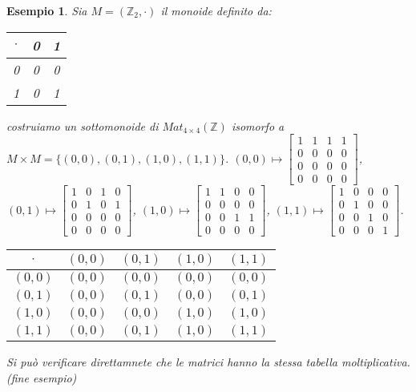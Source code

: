 \documentclass[a4paper,12pt]{article}
\theoremstyle{def}
\theoremstyle{prop}
\theoremstyle{esempio}
\newtheorem*{example}{Esempio}
\theoremstyle{dimostrazione}
\theoremstyle{teo}
\theoremstyle{osservazione}
\begin{document}
\newpage
\begin{example}
	Sia \(M = (\mathbb{Z}_2, \cdot)\) il monoide definito da:
	\begin{table}[htbp]
		\centering
		\begin{tabular}{|c|c|c|}
			\hline
			\(\cdot\) & 0 & 1 \\ \hline
			0         & 0 & 0 \\ \hline
			1         & 0 & 1 \\ \hline
		\end{tabular}
	\end{table}
	\newline costruiamo un sottomonoide di \(Mat_{4 \times 4}(\mathbb{Z})\) isomorfo a \(M \times M = \{(0,0), (0,1),
	(1,0),(1,1)\}\).\newline
	\newline\((0,0) \mapsto
	\begin{bmatrix}
		1 & 1 & 1 & 1  \\
		0 & 0 & 0 & 0  \\
		0 & 0 & 0 & 0  \\
		0 & 0 & 0 & 0
	\end{bmatrix}\),
	\((0,1) \mapsto \begin{bmatrix}
		1 & 0 & 1 & 0  \\
		0 & 1 & 0 & 1  \\
		0 & 0 & 0 & 0  \\
		0 & 0 & 0 & 0
	\end{bmatrix} \),
	\((1,0) \mapsto \begin{bmatrix}
		1 & 1 & 0 & 0  \\
		0 & 0 & 0 & 0  \\
		0 & 0 & 1 & 1  \\
		0 & 0 & 0 & 0
	\end{bmatrix} \),
	\((1,1) \mapsto \begin{bmatrix}
		1 & 0 & 0 & 0  \\
		0 & 1 & 0 & 0  \\
		0 & 0 & 1 & 0  \\
		0 & 0 & 0 & 1
	\end{bmatrix} \).\newline
	
	\begin{table}[htbp]
		\centering
		\begin{tabular}{|c|c|c|c|c|}
			\hline
			\(\cdot\) & \((0,0)\) & \((0,1)\) & \((1,0)\) & \((1,1)\) \\ \hline
			\((0,0)\) & \((0,0)\) & \((0,0)\) & \((0,0)\) & \((0,0)\) \\ \hline
			\((0,1)\) & \((0,0)\) & \((0,1)\) & \((0,0)\) & \((0,1)\) \\ \hline
			\((1,0)\) & \((0,0)\) & \((0,0)\) & \((1,0)\) & \((1,0)\) \\ \hline
			\((1,1)\) & \((0,0)\) & \((0,1)\) & \((1,0)\) & \((1,1)\) \\ \hline
		\end{tabular}
	\end{table}
	Si può verificare direttamnete che le matrici hanno la stessa tabella moltiplicativa. (fine esempio)
\end{example}
\end{document}
